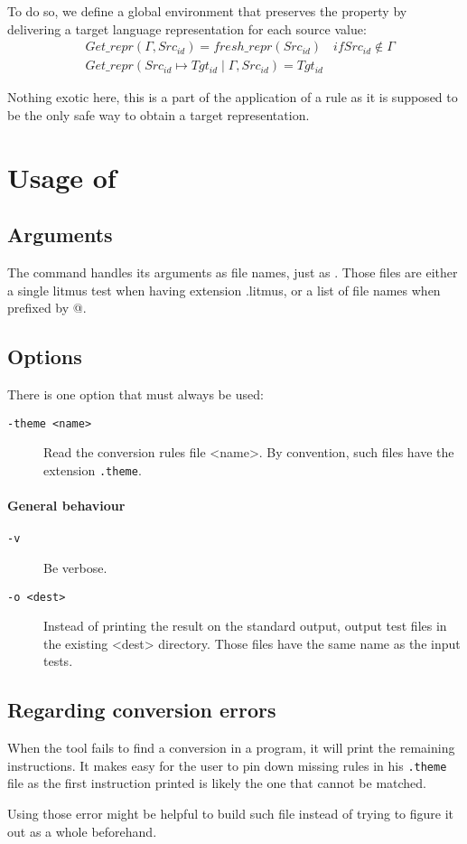 To do so, we define a global environment that preserves the property by delivering a target
language representation for each source value:
\begin{align*}
& Get\_repr(\Gamma,Src_{id}) = fresh\_repr(Src_{id}) & if Src_{id} \notin \Gamma\\
& Get\_repr(Src_{id}\mapsto Tgt_{id}\mid\Gamma,Src_{id}) = Tgt_{id} &
\end{align*}

Nothing exotic here, this is a part of the application of a rule as it is supposed
to be the only safe way to obtain a target representation.

\section{Usage of \jingle{}}

\subsection{Arguments}
The command \jingle{} handles its arguments as file names, just as \herd{}.
Those files are either a single litmus test when having extension .litmus,
or a list of file names when prefixed by @.

\subsection{Options}
There is one option that must always be used:

\begin{description}
\item[{\tt -theme <name>}] Read the conversion rules file <name>.
By convention, such files have the extension \verb+.theme+.
\end{description}

\paragraph{General behaviour}
\begin{description}
\item[{\tt -v}] Be verbose.
\item[{\tt -o <dest>}] Instead of printing the result on the standard output,
output test files in the existing <dest> directory. Those files have the same
name as the input tests.
\end{description}

\subsection{Regarding conversion errors}
When the tool fails to find a conversion in a program, it will print the remaining instructions.
It makes easy for the user to pin down missing rules in his \verb+.theme+ file
as the first instruction printed is likely the one that cannot be matched.

Using those error might be helpful to build such file instead of trying to figure it out
as a whole beforehand.
